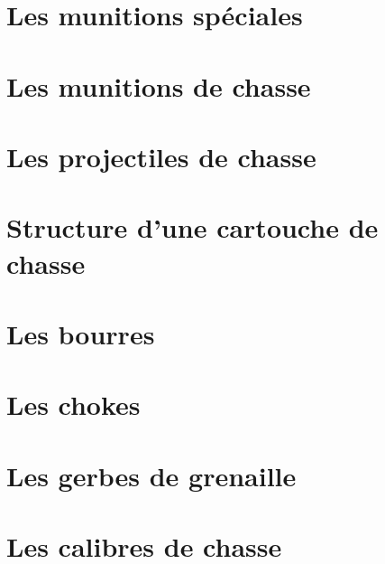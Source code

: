     \chapter{Les munitions spéciales}
    \label{chap:munitions_speciales}
    

    \chapter{Les munitions de chasse}
    \label{chap:munitions_chasse}
    

    \chapter{Les projectiles de chasse}
    \label{chap:projectiles_chasse}
    

    \chapter{Structure d'une cartouche de chasse}
    \label{chap:structure_cartouche_chasse}
    

    \chapter{Les bourres}
    \label{chap:les_bourres}
    

    \chapter{Les chokes}
    \label{chap:les_chokes}
    

    \chapter{Les gerbes de grenaille}
    \label{chap:gerbes_grenaille}
    

    \chapter{Les calibres de chasse}
    \label{chap:calibres_chasse}
    

